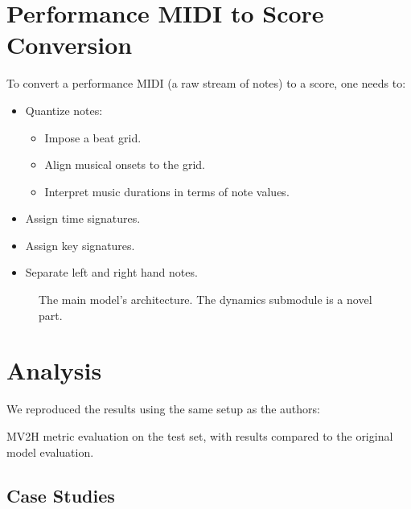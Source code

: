 \documentclass[a4paper, 9pt]{beamer}
\begin{document}
\section{Performance MIDI to Score Conversion}

\begin{frame}
To convert a performance MIDI (a raw stream of notes) to a score, one needs to: \pause\begin{itemize}
	\item Quantize notes: \begin{itemize}
		\item Impose a beat grid.\pause
		\item Align musical onsets to the grid.\pause
		\item Interpret music durations in terms of note values.\pause
	\end{itemize}
	\item Assign time signatures.\pause
	\item Assign key signatures.\pause
	\item Separate left and right hand notes.
\end{itemize}
\end{frame}

\begin{frame}
\begin{figure}[ht!]
\centering
\scalebox{0.7}{}
\caption{The main model's architecture. The dynamics submodule is a novel part.}
\end{figure}
\end{frame}

\section{Analysis}

\begin{frame}
We reproduced the results using the same setup as the authors:
\begin{table}[ht!]
\centering

\caption[MV2H metric evaluation on the test set.]{MV2H metric evaluation on the test set, with results compared to the original model evaluation.}
\end{table}
\end{frame}

\subsection{Case Studies}
\end{document}
